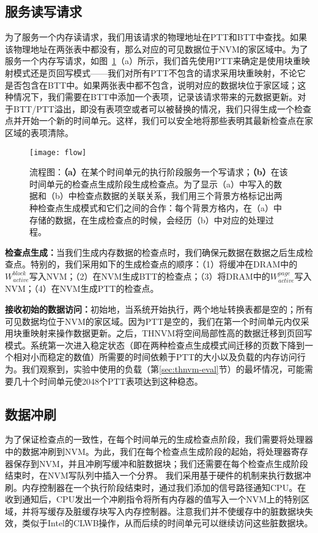 \subsection{服务读写请求}

为了服务一个内存读请求，我们用该请求的物理地址在PTT和BTT中查找。如果该物理地址在两张表中都没有，那么对应的可见数据位于NVM的家区域中。为了服务一个内存写请求，如图~\ref{fig:flow}（a）所示，我们首先使用PTT来确定是使用块重映射模式还是页回写模式——我们对所有PTT不包含的请求采用块重映射，不论它是否包含在BTT中。如果两张表中都不包含，说明对应的数据块位于家区域；这种情况下，我们需要在BTT中添加一个表项，记录该请求带来的元数据更新。对于BTT/PTT溢出，即没有表项空或者可以被替换的情况，我们只得生成一个检查点并开始一个新的时间单元。这样，我们可以安全地将那些表明其最新检查点在家区域的表项清除。

\begin{figure}[!ht]
\centering
\texttt{[image: flow]}
\caption{流程图：\textbf{（a）}在某个时间单元的执行阶段服务一个写请求；\textbf{（b）}在该时间单元的检查点生成阶段生成检查点。为了显示（a）中写入的数据和（b）中检查点数据的关联关系，我们用三个背景方格标记出两种检查点生成模式和它们之间的合作：每个背景方格内，在（a）中存储的数据，在生成检查点的时候，会经历（b）中对应的处理过程。}
\label{fig:flow}
\end{figure}

\textbf{检查点生成：}当我们生成内存数据的检查点时，我们确保元数据在数据之后生成检查点。特别的，我们采用如下的生成检查点的顺序：（1）将缓冲在DRAM中的$W^{block}_{active}$写入NVM；（2）在NVM生成BTT的检查点；（3）将DRAM中的$W^{page}_{active}$写入NVM；（4）在NVM生成PTT的检查点。

\textbf{接收初始的数据访问：}初始地，当系统开始执行，两个地址转换表都是空的；所有可见数据均位于NVM的家区域。因为PTT是空的，我们在第一个时间单元内仅采用块重映射来操作数据更新。之后，THNVM将空间局部性高的数据迁移到页回写模式。系统第一次进入稳定状态（即在两种检查点生成模式间迁移的页数下降到一个相对小而稳定的数值）所需要的时间依赖于PTT的大小以及负载的内存访问行为。我们观察到，实验中使用的负载（第\ref{sec:thnvm-eval}节）的最坏情况，可能需要几十个时间单元使2048个PTT表项达到这种稳态。

\subsection{数据冲刷}

为了保证检查点的一致性，在每个时间单元的生成检查点阶段，我们需要将处理器中的数据冲刷到NVM。为此，我们在每个检查点生成阶段的起始，将处理器寄存器保存到NVM，并且冲刷写缓冲和脏数据块；我们还需要在每个检查点生成阶段结束时，在NVM写队列中插入一个分界。 
我们采用基于硬件的机制来执行数据冲刷。内存控制器在一个执行阶段结束时，通过我们添加的信号路径通知CPU。在收到通知后，CPU发出一个冲刷指令将所有内存器的值写入一个NVM上的特别区域，并将写缓存及脏缓存块写入内存控制器。注意我们并不使缓存中的脏数据块失效，类似于Intel的CLWB操作，从而后续的时间单元可以继续访问这些脏数据块。

